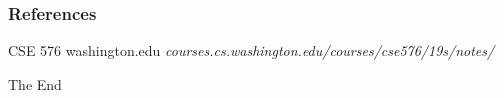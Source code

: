 \documentclass{beamer}
\begin{document}
	
	
	\begin{frame}
		\frametitle{References}
		\footnotesize{
			\begin{thebibliography}{99} %
				 CSE 576 
				\newblock washington.edu
				\newblock \emph{courses.cs.washington.edu/courses/cse576/19s/notes/}
			\end{thebibliography}
		}
	\end{frame}
	
	
	\begin{frame}
		\Huge{\centerline{The End}}
	\end{frame}
	
	
\end{document}
